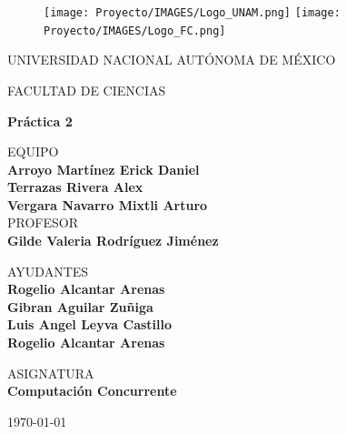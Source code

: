 \documentclass[10pt,letterpaper]{article}
\begin{document}
\thispagestyle{empty}
	
	\begin{figure}[ht]
			\texttt{[image: Proyecto/IMAGES/Logo\_UNAM.png]}
			\label{EscudoUNAM}
	   \endminipage
			\texttt{[image: Proyecto/IMAGES/Logo\_FC.png]}
			\label{EscudoFC}
		\endminipage
	\end{figure}
	
	\begin{center}
	\vspace{0.8cm}
	\LARGE
	UNIVERSIDAD NACIONAL AUTÓNOMA DE MÉXICO 
	
	\vspace{0.8cm}
	\LARGE
	FACULTAD DE CIENCIAS
	
	\vspace{.5cm}	
	\Large
	\textbf{Práctica 2}

	\vspace{.7cm}
	\normalsize	
	EQUIPO \\
	\vspace{.3cm}
	\large
	\textbf{Arroyo Martínez Erick Daniel} \\ 
    \textbf{Terrazas Rivera Alex}\\
    \textbf{Vergara Navarro Mixtli Arturo}
	\vspace{.7cm}\\
	\normalsize	
	PROFESOR \\
	\vspace{.3cm}
	\large
	\textbf{Gilde Valeria Rodríguez Jiménez}

    \vspace{.7cm}
	\normalsize	
	AYUDANTES \\
	\vspace{.3cm}
	\large
	\textbf{Rogelio Alcantar Arenas}\\
    \textbf{Gibran Aguilar Zuñiga}\\
    \textbf{Luis Angel Leyva Castillo}\\
    \textbf{Rogelio Alcantar Arenas}
	
	\vspace{.7cm}
	\normalsize	
	ASIGNATURA \\
	\vspace{.3cm}
	\large
	\textbf{Computación Concurrente}
	
	\vspace{.2cm}
	\today
	\end{center}
	\newpage

\end{document}
